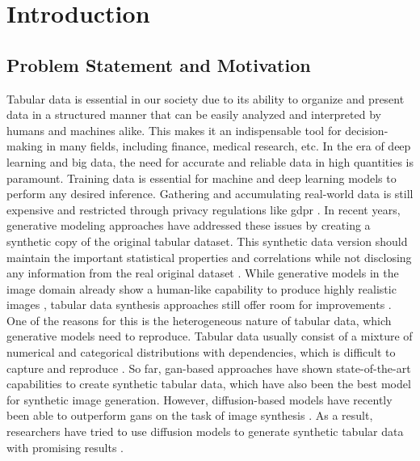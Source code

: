 \chapter{Introduction}
\label{ch:introduction}

\section{Problem Statement and Motivation}
\label{ch:intro-problemStatement}

Tabular data is essential in our society due to its ability to organize and present data in a structured manner
that can be easily analyzed and interpreted by humans and machines alike.
This makes it an indispensable tool for decision-making in many fields, including finance, medical research, etc.
In the era of deep learning and big data, the need for accurate and reliable data in high quantities is paramount.
Training data is essential for machine and deep learning \glspl{model} to perform any desired inference.
Gathering and accumulating real-world data is still expensive \cite{borisov2022DeepNeuralNetworks} and restricted through privacy regulations like \gls{gdpr}  \cite{european_commission_regulation_2016}.
In recent years, generative modeling approaches have addressed these issues by creating a synthetic copy of the original tabular dataset.
This synthetic data version should maintain the important statistical properties and correlations while not disclosing any information from the real original dataset \cite{goodfellow2020GenerativeAdversarialNetworks, mottini2018AirlinePassengerName}.
While generative \glspl{model} in the image domain already show a human-like capability to produce highly realistic images \cite{dhariwal2021DiffusionModelsBeat},
tabular data synthesis approaches still offer room for improvements \cite{chundawat2022UniversalMetricRobust}.
One of the reasons for this is the heterogeneous nature of tabular data, which generative \glspl{model} need to reproduce.
Tabular data usually consist of a mixture of numerical and categorical distributions with dependencies, which is difficult to capture and reproduce \cite{borisov2022DeepNeuralNetworks}.
So far, \acrfull{gan}-based approaches have shown state-of-the-art capabilities to create synthetic tabular data, which have also been the best \gls{model} for synthetic image generation.
However, diffusion-based \glspl{model} have recently been able to outperform \glspl{gan} on the task of image synthesis \cite{dhariwal2021DiffusionModelsBeat}.
As a result, researchers have tried to use diffusion \glspl{model} to generate synthetic tabular data with promising results \cite{kotelnikov2022TabDDPMModellingTabular, zheng2022DiffusionModelsMissing}.

